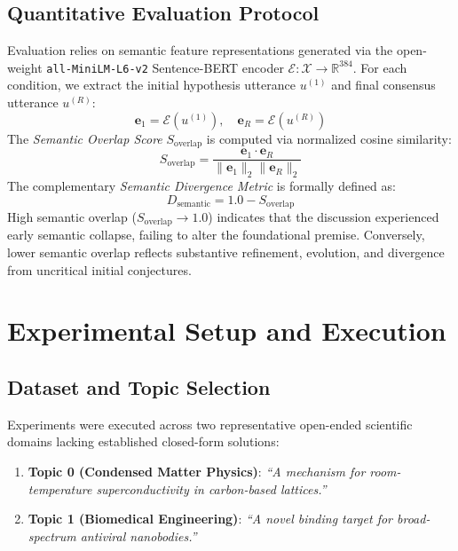 \documentclass[conference,onecolumn]{IEEEtran}
\begin{document}
\subsection{Quantitative Evaluation Protocol}
Evaluation relies on semantic feature representations generated via the open-weight \texttt{all-MiniLM-L6-v2} Sentence-BERT encoder $\mathcal{E}: \mathcal{X} \rightarrow \mathbb{R}^{384}$. For each condition, we extract the initial hypothesis utterance $u^{(1)}$ and final consensus utterance $u^{(R)}$:
\begin{equation}
    \mathbf{e}_1 = \mathcal{E}\left(u^{(1)}\right), \quad \mathbf{e}_R = \mathcal{E}\left(u^{(R)}\right)
\end{equation}
The \textit{Semantic Overlap Score} $S_{\text{overlap}}$ is computed via normalized cosine similarity:
\begin{equation}
    S_{\text{overlap}} = \frac{\mathbf{e}_1 \cdot \mathbf{e}_R}{\|\mathbf{e}_1\|_2 \|\mathbf{e}_R\|_2}
\end{equation}
The complementary \textit{Semantic Divergence Metric} is formally defined as:
\begin{equation}
    D_{\text{semantic}} = 1.0 - S_{\text{overlap}}
\end{equation}
High semantic overlap ($S_{\text{overlap}} \rightarrow 1.0$) indicates that the discussion experienced early semantic collapse, failing to alter the foundational premise. Conversely, lower semantic overlap reflects substantive refinement, evolution, and divergence from uncritical initial conjectures.

\section{Experimental Setup and Execution}

\subsection{Dataset and Topic Selection}
Experiments were executed across two representative open-ended scientific domains lacking established closed-form solutions:
\begin{enumerate}
    \item \textbf{Topic 0 (Condensed Matter Physics)}: \textit{``A mechanism for room-temperature superconductivity in carbon-based lattices.''}
    \item \textbf{Topic 1 (Biomedical Engineering)}: \textit{``A novel binding target for broad-spectrum antiviral nanobodies.''}
\end{enumerate}
\end{document}

